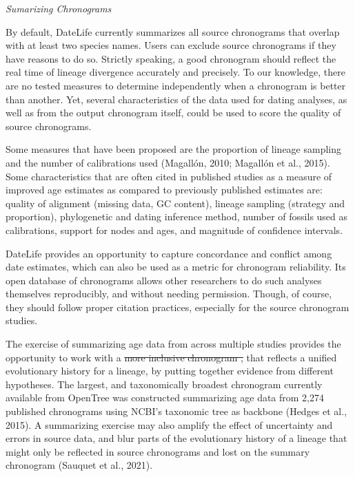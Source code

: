 \documentclass[
  man]{apa6}
\providecommand{\DIFaddtex}[1]{{\protect\color{blue}\uwave{#1}}} %
\providecommand{\DIFdeltex}[1]{{\protect\color{red}\sout{#1}}}                      %
\providecommand{\DIFaddbegin}{} %
\providecommand{\DIFaddend}{} %
\providecommand{\DIFdelbegin}{} %
\providecommand{\DIFdelend}{} %
\providecommand{\DIFadd}[1]{\texorpdfstring{\DIFaddtex{#1}}{#1}} %
\providecommand{\DIFdel}[1]{\texorpdfstring{\DIFdeltex{#1}}{}} %
\newcommand{\DIFscaledelfig}{0.5}
\newlength{\DIFdelgraphicswidth} %
\newlength{\DIFdelgraphicsheight} %
\newcommand{\DIFaddincludegraphics}[2][]{{\color{blue}\fbox{\DIFOincludegraphics[#1]{#2}}}} %
\newcommand{\DIFdelincludegraphics}[2][]{%
\sbox{\DIFdelgraphicsbox}{\DIFOincludegraphics[#1]{#2}}%
\settoboxwidth{\DIFdelgraphicswidth}{\DIFdelgraphicsbox} %
\settoboxtotalheight{\DIFdelgraphicsheight}{\DIFdelgraphicsbox} %
\scalebox{\DIFscaledelfig}{%
\parbox[b]{\DIFdelgraphicswidth}{\usebox{\DIFdelgraphicsbox}\\[-\baselineskip] \rule{\DIFdelgraphicswidth}{0em}}\llap{\resizebox{\DIFdelgraphicswidth}{\DIFdelgraphicsheight}{%
\setlength{\unitlength}{\DIFdelgraphicswidth}%
\begin{picture}(1,1)%
\thicklines\linethickness{2pt} %
{\color[rgb]{1,0,0}\put(0,0){\framebox(1,1){}}}%
{\color[rgb]{1,0,0}\put(0,0){\line( 1,1){1}}}%
{\color[rgb]{1,0,0}\put(0,1){\line(1,-1){1}}}%
\end{picture}%
}\hspace*{3pt}}} %
} %
\DeclareRobustCommand{\DIFaddbegin}{\DIFOaddbegin \let\includegraphics\DIFaddincludegraphics} %
\DeclareRobustCommand{\DIFaddend}{\DIFOaddend \let\includegraphics\DIFOincludegraphics} %
\DeclareRobustCommand{\DIFdelbegin}{\DIFOdelbegin \let\includegraphics\DIFdelincludegraphics} %
\DeclareRobustCommand{\DIFdelend}{\DIFOaddend \let\includegraphics\DIFOincludegraphics} %
\begin{document}
\DIFaddend \begin{center}
\emph{Sumarizing Chronograms}
\end{center}

By default, DateLife currently summarizes all source chronograms that overlap with at least two species names. Users can exclude source chronograms if they have reasons to do so.
Strictly speaking, a good chronogram should reflect the real time of lineage divergence accurately and precisely.
To our knowledge, there are no tested measures to determine independently when a chronogram is better than another. Yet, several characteristics of the data used for dating analyses, as well as from the output chronogram itself, could be used to score the quality of source chronograms.

Some measures that have been proposed are the proportion of lineage sampling and the number of calibrations used (Magallón, 2010; Magallón et al., 2015).
Some characteristics that are often cited in published studies as a measure of improved age estimates as compared to previously published estimates are: quality of alignment (missing data, GC content), lineage sampling (strategy and proportion), phylogenetic and dating inference method, number of fossils used as calibrations, support for nodes and ages, and magnitude of confidence intervals.

DateLife provides an opportunity to capture concordance and conflict among date estimates, which can also be used as a metric for chronogram reliability.
Its open database of chronograms allows other researchers to do such analyses themselves reproducibly, and without needing permission. Though, of course, they should follow proper citation practices, especially for the source chronogram studies.

The exercise of summarizing age data from across multiple studies provides the opportunity to work with a \DIFdelbegin \DIFdel{more inclusive chronogram ,
}\DIFdelend \DIFaddbegin \DIFadd{chronogram }\DIFaddend that reflects a unified evolutionary history for a lineage, by putting together evidence from different hypotheses.
The largest, and taxonomically broadest chronogram currently available from OpenTree was constructed summarizing age data from 2,274 published chronograms using NCBI's taxonomic tree as backbone (Hedges et al., 2015).
A summarizing exercise may also amplify the effect of uncertainty and errors in source data, and blur parts of the evolutionary history of a lineage that might only be reflected in source chronograms and lost on the summary chronogram (Sauquet et al., 2021).
\end{document}
